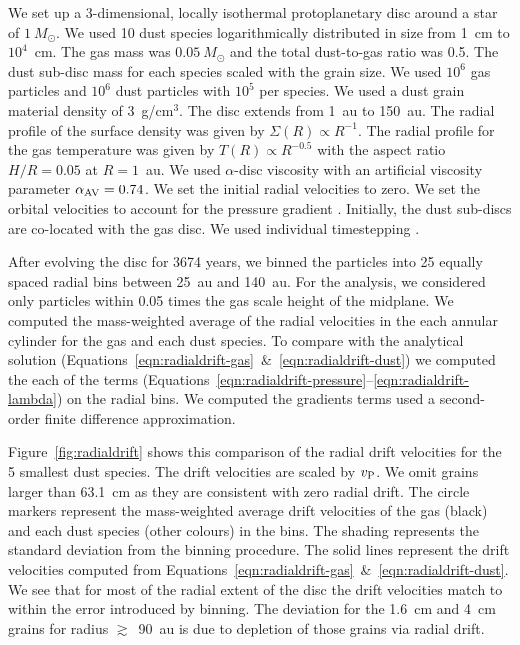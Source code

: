 \documentclass[fleqn,usenatbib]{mnras}
\begin{document}
We set up a 3-dimensional, locally isothermal protoplanetary disc around a star
of \(1~M_{\odot}\). We used 10 dust species logarithmically distributed in size
from 1~cm to \(10^4\)~cm. The gas mass was \(0.05~M_{\odot}\) and the total
dust-to-gas ratio was 0.5. The dust sub-disc mass for each species scaled with
the grain size. We used \(10^6\) gas particles and \(10^6\) dust particles with
\(10^5\) per species. We used a dust grain material density of 3~g/cm\({}^3\).
The disc extends from 1~au to 150~au. The radial profile of the surface density
was given by \(\Sigma(R) \propto R^{-1}\). The radial profile for the gas
temperature was given by \(T(R) \propto R^{-0.5}\) with the aspect ratio \(H/R =
0.05\) at \(R=1\)~au. We used \(\alpha\)-disc viscosity
\citep[Section~3.3.4]{Price2018PASA...35...31P} with an artificial viscosity
parameter \(\alpha_{\rm AV}=0.74\). We set the initial radial velocities to
zero. We set the orbital velocities to account for the pressure gradient
\citep[Section~3.3.2]{Price2018PASA...35...31P}. Initially, the dust sub-discs
are co-located with the gas disc. We used individual timestepping
\citep[Section~2.3.4]{Price2018PASA...35...31P}.

After evolving the disc for 3674 years, we binned the particles into 25 equally
spaced radial bins between 25~au and 140~au. For the analysis, we considered
only particles within 0.05 times the gas scale height of the midplane. We
computed the mass-weighted average of the radial velocities in the each annular
cylinder for the gas and each dust species. To compare with the analytical
solution (Equations~\ref{eqn:radialdrift-gas}~\&~\ref{eqn:radialdrift-dust}) we
computed the each of the terms
(Equations~\ref{eqn:radialdrift-pressure}--\ref{eqn:radialdrift-lambda}) on the
radial bins. We computed the gradients terms used a second-order finite
difference approximation.

Figure~\ref{fig:radialdrift} shows this comparison of the radial drift
velocities for the 5 smallest dust species. The drift velocities are scaled by
\(v_{\rm P}\). We omit grains larger than 63.1~cm as they are consistent with
zero radial drift. The circle markers represent the mass-weighted average drift
velocities of the gas (black) and each dust species (other colours) in the bins.
The shading represents the standard deviation from the binning procedure. The
solid lines represent the drift velocities computed from
Equations~\ref{eqn:radialdrift-gas}~\&~\ref{eqn:radialdrift-dust}. We see that
for most of the radial extent of the disc the drift velocities match to within
the error introduced by binning. The deviation for the 1.6~cm and 4~cm grains
for radius \(\gtrsim\)~90~au is due to depletion of those grains via radial
drift.
\end{document}
